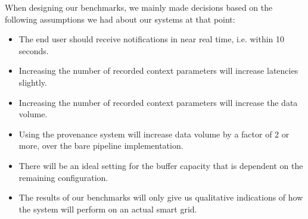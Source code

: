 \vspace{3mm}

When designing our benchmarks, we mainly made decisions based on the following assumptions we had about our systems at that point: 

\begin{itemize}
  \item The end user should receive notifications in near real time, i.e. within 10 seconds.
  \item Increasing the number of recorded context parameters will increase latencies slightly.
  \item Increasing the number of recorded context parameters will increase the data volume.
  \item Using the provenance system will increase data volume by a factor of 2 or more, over the bare pipeline implementation.
  \item There will be an ideal setting for the buffer capacity that is dependent on the remaining configuration.
  \item The results of our benchmarks will only give us qualitative indications of how the system will perform on an actual smart grid.
\end{itemize}

